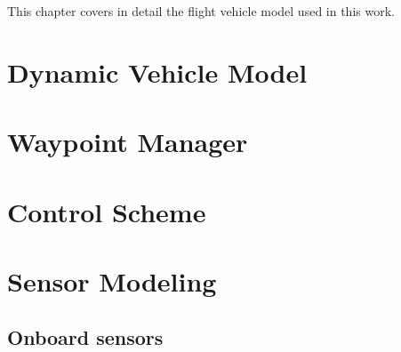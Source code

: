 \documentclass[../Thesis.tex]{subfiles}
\begin{document}
This chapter covers in detail the flight vehicle model used in this work.

\section{Dynamic Vehicle Model}


\section{Waypoint Manager}

\section{Control Scheme}

\section{Sensor Modeling}
\subsection{Onboard sensors}
\end{document}

